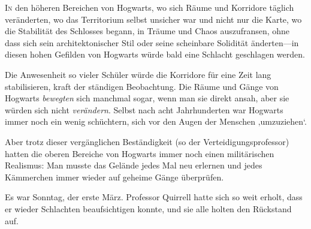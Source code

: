 
\lettrine{I}{n} den höheren Bereichen von Hogwarts, wo sich Räume und Korridore täglich veränderten, wo das Territorium selbst unsicher war und nicht nur die Karte, wo die Stabilität des Schlosses begann, in Träume und Chaos auszufransen, ohne dass sich sein architektonischer Stil oder seine scheinbare Solidität änderten—in diesen hohen Gefilden von Hogwarts würde bald eine Schlacht geschlagen werden.

Die Anwesenheit so vieler Schüler würde die Korridore für eine Zeit lang stabilisieren, kraft der ständigen Beobachtung. Die Räume und Gänge von Hogwarts \emph{bewegten} sich manchmal sogar, wenn man sie direkt ansah, aber sie würden sich nicht \emph{verändern}. Selbst nach acht Jahrhunderten war Hogwarts immer noch ein wenig schüchtern, sich vor den Augen der Menschen ‚umzuziehen‘.

Aber trotz dieser vergänglichen Beständigkeit (so der Verteidigungsprofessor) hatten die oberen Bereiche von Hogwarts immer noch einen militärischen Realismus: Man musste das Gelände jedes Mal neu erlernen und jedes Kämmerchen immer wieder auf geheime Gänge überprüfen.

Es war Sonntag, der erste März. Professor Quirrell hatte sich so weit erholt, dass er wieder Schlachten beaufsichtigen konnte, und sie alle holten den Rückstand auf.

